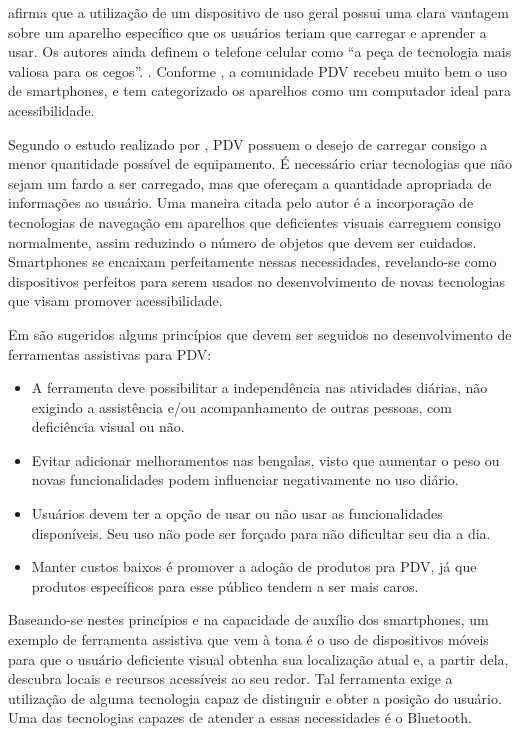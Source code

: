 \documentclass[twoside,english,brazilian]{UNISINOSartigo}
\begin{document}
 afirma que a utilização de um dispositivo de uso geral possui uma clara vantagem sobre um aparelho específico que os usuários teriam que carregar e aprender a usar. Os autores ainda definem o telefone celular como “a peça de tecnologia mais valiosa para os cegos”. \cite{mau2008blindaid}. Conforme , a comunidade PDV recebeu muito bem o uso de smartphones, e tem categorizado os aparelhos como um computador ideal para acessibilidade.

Segundo o estudo realizado por , PDV possuem o desejo de carregar consigo a menor quantidade possível de equipamento. É necessário criar tecnologias que não sejam um fardo a ser carregado, mas que ofereçam a quantidade apropriada de informações ao usuário. Uma maneira citada pelo autor é a incorporação de tecnologias de navegação em aparelhos que deficientes visuais carreguem consigo normalmente, assim reduzindo o número de objetos que devem ser cuidados. Smartphones se encaixam perfeitamente nessas necessidades, revelando-se como dispositivos perfeitos para serem usados no desenvolvimento de novas tecnologias que visam promover acessibilidade.

Em  são sugeridos alguns princípios que devem ser seguidos no desenvolvimento de ferramentas assistivas para PDV:
\begin{itemize}
	\item A ferramenta deve possibilitar a independência nas atividades diárias, não exigindo a assistência e/ou acompanhamento de outras pessoas, com deficiência visual ou não.
	\item Evitar adicionar melhoramentos nas bengalas, visto que aumentar o peso ou novas funcionalidades podem influenciar negativamente no uso diário.
	\item Usuários devem ter a opção de usar ou não usar as funcionalidades disponíveis. Seu uso não pode ser forçado para não dificultar seu dia a dia.
	\item Manter custos baixos é promover a adoção de produtos pra PDV, já que produtos específicos para esse público tendem a ser mais caros.
\end{itemize}

Baseando-se nestes princípios e na capacidade de auxílio dos smartphones, um exemplo de ferramenta assistiva que vem à tona é o uso de dispositivos móveis para que o usuário deficiente visual obtenha sua localização atual e, a partir dela, descubra locais e recursos acessíveis ao seu redor. Tal ferramenta exige a utilização de alguma tecnologia capaz de distinguir e obter a posição do usuário. Uma das tecnologias capazes de atender a essas necessidades é o Bluetooth.
\end{document}
